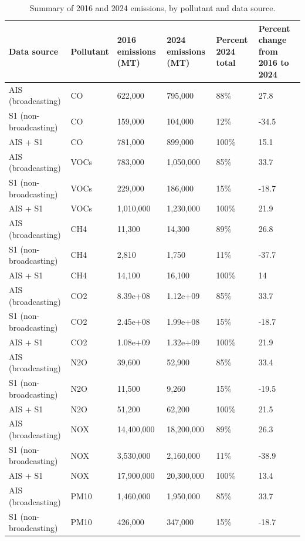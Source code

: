 \begin{table}[!h]
\centering
\caption{\label{tab:total_percent_change_by_fleet}Summary of 2016 and 2024 emissions, by pollutant and data source.}
\centering
\fontsize{8}{10}\selectfont
\begin{tabular}[t]{l|l|l|l|l|l}
\hline
Data source & Pollutant & 2016 emissions (MT) & 2024 emissions (MT) & Percent 2024 total & Percent change from 2016 to 2024\\
\hline
AIS (broadcasting) & CO & 622,000 & 795,000 & 88\% & 27.8\\
\hline
S1 (non-broadcasting) & CO & 159,000 & 104,000 & 12\% & -34.5\\
\hline
AIS + S1 & CO & 781,000 & 899,000 & 100\% & 15.1\\
\hline
AIS (broadcasting) & VOCs & 783,000 & 1,050,000 & 85\% & 33.7\\
\hline
S1 (non-broadcasting) & VOCs & 229,000 & 186,000 & 15\% & -18.7\\
\hline
AIS + S1 & VOCs & 1,010,000 & 1,230,000 & 100\% & 21.9\\
\hline
AIS (broadcasting) & CH4 & 11,300 & 14,300 & 89\% & 26.8\\
\hline
S1 (non-broadcasting) & CH4 & 2,810 & 1,750 & 11\% & -37.7\\
\hline
AIS + S1 & CH4 & 14,100 & 16,100 & 100\% & 14\\
\hline
AIS (broadcasting) & CO2 & 8.39e+08 & 1.12e+09 & 85\% & 33.7\\
\hline
S1 (non-broadcasting) & CO2 & 2.45e+08 & 1.99e+08 & 15\% & -18.7\\
\hline
AIS + S1 & CO2 & 1.08e+09 & 1.32e+09 & 100\% & 21.9\\
\hline
AIS (broadcasting) & N2O & 39,600 & 52,900 & 85\% & 33.4\\
\hline
S1 (non-broadcasting) & N2O & 11,500 & 9,260 & 15\% & -19.5\\
\hline
AIS + S1 & N2O & 51,200 & 62,200 & 100\% & 21.5\\
\hline
AIS (broadcasting) & NOX & 14,400,000 & 18,200,000 & 89\% & 26.3\\
\hline
S1 (non-broadcasting) & NOX & 3,530,000 & 2,160,000 & 11\% & -38.9\\
\hline
AIS + S1 & NOX & 17,900,000 & 20,300,000 & 100\% & 13.4\\
\hline
AIS (broadcasting) & PM10 & 1,460,000 & 1,950,000 & 85\% & 33.7\\
\hline
S1 (non-broadcasting) & PM10 & 426,000 & 347,000 & 15\% & -18.7\\

\end{tabular}
\end{table}
